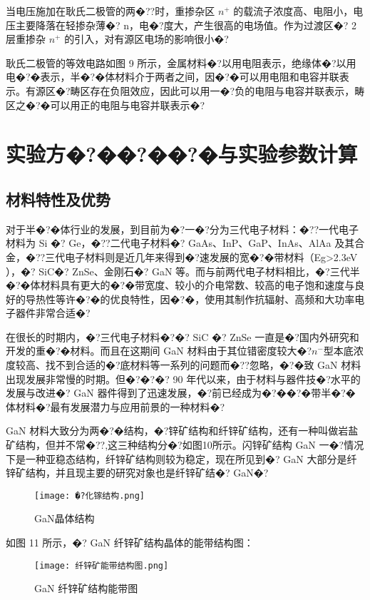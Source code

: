 \documentclass{zjureport}
\begin{document}
当电压施加在耿氏二极管的两�??时，重掺杂区 $n^{+}$ 的载流子浓度高、电阻小，电压主要降落在轻掺杂薄�? n，电�?度大，产生很高的电场值。作为过渡区�? 2 层重掺杂 $n^{+}$ 的引入，对有源区电场的影响很小�?

耿氏二极管的等效电路如图 9 所示，金属材料�?以用电阻表示，绝缘体�?以用电�?�表示，半�?�体材料介于两者之间，因�?�可以用电阻和电容并联表示。有源区�?畴区存在负阻效应，因此可以用一�?负的电阻与电容并联表示，畴区之�?�可以用正的电阻与电容并联表示�?


\section{实验方�?��?��?�与实验参数计算}

\subsection{材料特性及优势}
对于半�?�体行业的发展，到目前为�?一�?分为三代电子材料：�??一代电子材料为 Si �? Ge，�??二代电子材料�? GaAs、InP、GaP、InAs、AlAa 及其合金，�??三代电子材料则是近几年来得到�?速发展的宽�?�带材料（Eg>2.3eV ），�? SiC�? ZnSe、金刚石�? GaN 等。而与前两代电子材料相比，�?三代半�?�体材料具有更大的�?�带宽度、较小的介电常数、较高的电子饱和速度与良好的导热性等许�?�的优良特性，因�?�，使用其制作抗辐射、高频和大功率电子器件非常合适�? 

在很长的时期内，�?三代电子材料�?�? SiC �? ZnSe 一直是�?国内外研究和开发的重�?�材料。而且在这期间 GaN 材料由于其位错密度较大�?$n^{-}$型本底浓度较高、找不到合适的�?底材料等一系列的问题而�??忽略，�?�致 GaN 材料出现发展非常慢的时期。但�?�?�? 90 年代以来，由于材料与器件技�?水平的发展与改进�? GaN 器件得到了迅速发展，�?前已经成为�?��?�带半�?�体材料�?最有发展潜力与应用前景的一种材料�?

GaN 材料大致分为两�?�结构，�?锌矿结构和纤锌矿结构，还有一种叫做岩盐矿结构，但并不常�??,这三种结构分�?如图10所示。闪锌矿结构 GaN 一�?情况下是一种亚稳态结构，纤锌矿结构则较为稳定，现在所见到�? GaN 大部分是纤锌矿结构，并且现主要的研究对象也是纤锌矿结�? GaN�?

\begin{figure}[htbp]
	\centering
	\texttt{[image: �?化镓结构.png]}
	\caption{GaN晶体结构}
\end{figure}
如图 11 所示，�? GaN 纤锌矿结构晶体的能带结构图：
\begin{figure}[htbp]
	\centering
	\texttt{[image: 纤锌矿能带结构图.png]}
	\caption{GaN 纤锌矿结构能带图}
\end{figure}
\end{document}
